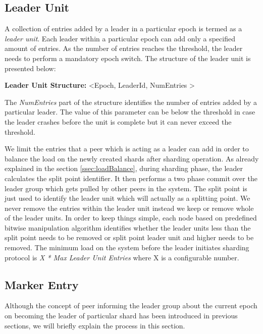 \documentclass[12pt,a4paper,twoside,openright]{book}
\begin{document}
\subsection{Leader Unit}
\label{ssec:leaderUnit}

A collection of entries added by a leader in a particular epoch is termed as a \textit{leader unit}. Each leader within a particular epoch can add only a specified amount of entries. As the number of entries reaches the threshold, the leader needs to perform a mandatory epoch switch. The structure of the leader unit is presented below:

\begin{tcolorbox}
\textbf{Leader Unit Structure:} \textless Epoch, LeaderId, NumEntries \textgreater
\end{tcolorbox}

The \textit{NumEntries} part of the structure identifies the number of entries added by a particular leader. The value of this parameter can be below the threshold in case the leader crashes before the unit is complete but it can never exceed the threshold. 

\par We limit the entries that a peer which is acting as a leader can add in order to balance the load on the newly created shards after sharding operation. As already explained in the section \ref{ssec:loadBalance}, during sharding phase, the leader calculates the split point identifier. It then performs a two phase commit over the leader group which gets pulled by other peers in the system. The split point is just used to identify the leader unit which will actually as a splitting point. We never remove the entries within the leader unit instead we keep or remove whole of the leader units. In order to keep things simple, each node based on predefined bitwise manipulation algorithm identifies whether the leader units less than the split point needs to be removed or split point leader unit and higher needs to be removed. The minimum load on the system before the leader initiates sharding protocol is \textit{ X * Max Leader Unit Entries} where X is a configurable number.



\subsection{Marker Entry}
Although the concept of peer informing the leader group about the current epoch on becoming the leader of particular shard has been introduced in previous sections, we will briefly explain the process in this section. 
\end{document}
